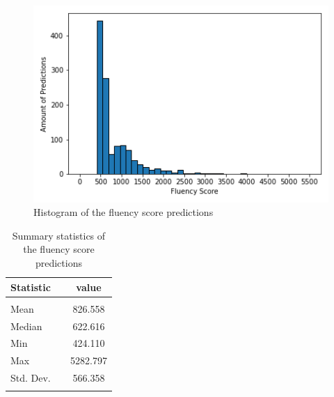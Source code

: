 \documentclass[11pt]{article}
\begin{document}
\vspace{1cm}
\begin{figure}[h]
    \centering
    \includegraphics[scale=0.8]{figures/hist.png}
    \caption{Histogram of the fluency score predictions }
    \label{fig:histogram}
\end{figure}
\vspace{1cm}


\begin{table}[h]
\centering
\caption{Summary statistics of the fluency score predictions}
\label{tab:my-table summary stat}
\begin{tabular}{llc}
\toprule
\textbf{Statistic} &  &value \\ \midrule
          &  &           \\
Mean      &  & 826.558   \\
Median    &  & 622.616   \\
Min       &  & 424.110   \\
Max       &  & 5282.797  \\
Std. Dev. &  & 566.358   \\ 
\\ \bottomrule
\end{tabular}
\end{table}
\end{document}
